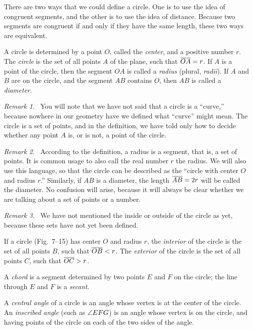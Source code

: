 \documentclass[11pt]{book}
\newenvironment{VIIremarkn}[1]%
  {\par\medskip\noindent\emph{Remark #1.}\ }{\par\medskip}
\begin{document}
There are two ways that we could define a circle. One is to use the idea of
congruent segments, and the other is to use the idea of distance. Because two
segments are congruent if and only if they have the same length, these two ways
are equivalent.

\begin{definition}
A circle is determined by a point $O$, called the \emph{center}, and a positive
number $r$. The \emph{circle} is the set of all points $A$ of the plane, such
that $\overline{OA} = r$. If $A$ is a point of the circle, then the segment $OA$ is
called a \emph{radius} (plural, \emph{radii}). If $A$ and $B$ are on the
circle, and the segment $AB$ contains $O$, then $AB$ is called a
\emph{diameter}.
\end{definition}

\begin{VIIremarkn}{1}
You will note that we have not said that a circle is a ``curve,'' because
nowhere in our geometry have we defined what ``curve'' might mean. The circle
is a set of points, and in the definition, we have told only how to decide
whether any point $A$ is, or is not, a point of the circle.
\end{VIIremarkn}

\begin{VIIremarkn}{2}
According to the definition, a radius is a segment, that is, a set of points.
It is common usage to also call the real number $r$ the radius. We will also
use this language, so that the circle can be described as the ``circle with
center $O$ and radius $r$.'' Similarly, if $AB$ is a diameter, the length
$\overline{AB} = 2r$ will be called the diameter. No confusion will arise, because it
will always be clear whether we are talking about a set of points or a number.
\end{VIIremarkn}

\begin{VIIremarkn}{3}
We have not mentioned the inside or outside of the circle as yet, because these
sets have not yet been defined.
\end{VIIremarkn}

\begin{definition}
If a circle (Fig.~7--15) has center $O$ and radius $r$, the \emph{interior} of
the circle is the set of all points $B$, such that $\overline{OB} < r$. The
\emph{exterior} of the circle is the set of all points $C$, such that
$\overline{OC} > r$.

A \emph{chord} is a segment determined by two points $E$ and $F$ on the circle;
the line through $E$ and $F$ is a \emph{secant}.

A \emph{central angle} of a circle is an angle whose vertex is at the center of
the circle. An \emph{inscribed angle} (such as $\angle EFG$) is an angle whose
vertex is on the circle, and having points of the circle on each of the two
sides of the angle.
\end{definition}
\end{document}

